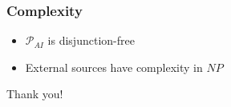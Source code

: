 \documentclass[smaller, dvipsnames]{beamer}
\begin{document}
\begin{frame}
	\frametitle{Complexity}
	\begin{itemize}
		\item \(\mathcal{P}_{AI}\) is \alert{disjunction-free}
		\item \alert{External sources} have complexity in \(NP\)
	\end{itemize}
\end{frame}

\begin{frame}[standout]
    Thank you!
\end{frame}
\end{document}
